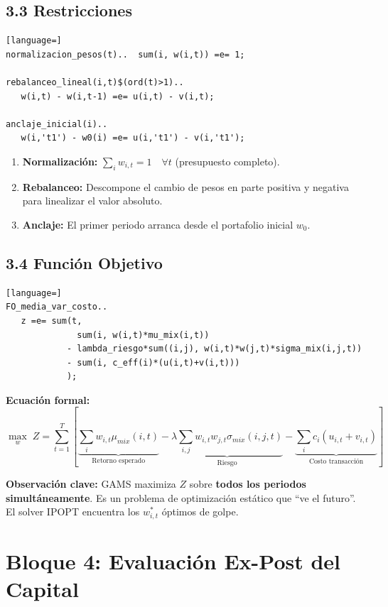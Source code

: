 \documentclass[11pt,a4paper]{article}
\begin{document}
\subsection{3.3 Restricciones}
\begin{lstlisting}[language=]
normalizacion_pesos(t)..  sum(i, w(i,t)) =e= 1;

rebalanceo_lineal(i,t)$(ord(t)>1)..
   w(i,t) - w(i,t-1) =e= u(i,t) - v(i,t);

anclaje_inicial(i)..
   w(i,'t1') - w0(i) =e= u(i,'t1') - v(i,'t1');
\end{lstlisting}

\begin{enumerate}
    \item \textbf{Normalización:} $\sum_i w_{i,t} = 1 \quad \forall t$ (presupuesto completo).
    \item \textbf{Rebalanceo:} Descompone el cambio de pesos en parte positiva y negativa para linealizar el valor absoluto.
    \item \textbf{Anclaje:} El primer periodo arranca desde el portafolio inicial $w_0$.
\end{enumerate}

\subsection{3.4 Función Objetivo}
\begin{lstlisting}[language=]
FO_media_var_costo..
   z =e= sum(t,
              sum(i, w(i,t)*mu_mix(i,t))
            - lambda_riesgo*sum((i,j), w(i,t)*w(j,t)*sigma_mix(i,j,t))
            - sum(i, c_eff(i)*(u(i,t)+v(i,t)))
            );
\end{lstlisting}

\textbf{Ecuación formal:}
\begin{equation}
    \max_{w} \; Z = \sum_{t=1}^{T} \left[ \underbrace{\sum_i w_{i,t} \mu_{mix}(i,t)}_{\text{Retorno esperado}} - \underbrace{\lambda \sum_{i,j} w_{i,t} w_{j,t} \sigma_{mix}(i,j,t)}_{\text{Riesgo}} - \underbrace{\sum_i c_i (u_{i,t} + v_{i,t})}_{\text{Costo transacción}} \right]
\end{equation}

\textbf{Observación clave:} GAMS maximiza $Z$ sobre \textbf{todos los periodos simultáneamente}. Es un problema de optimización estático que ``ve el futuro''. El solver IPOPT encuentra los $w_{i,t}^*$ óptimos de golpe.

\section{Bloque 4: Evaluación Ex-Post del Capital}
\end{document}
